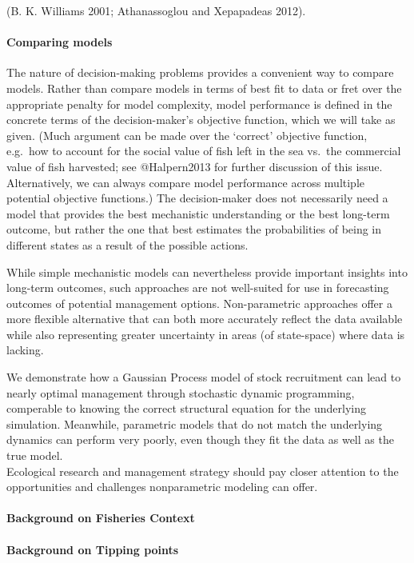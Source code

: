 \documentclass[author-year, review]{elsarticle} %
\begin{document}
(B. K. Williams 2001; Athanassoglou and Xepapadeas 2012).

\paragraph{Comparing models}

The nature of decision-making problems provides a convenient way to
compare models. Rather than compare models in terms of best fit to data
or fret over the appropriate penalty for model complexity, model
performance is defined in the concrete terms of the decision-maker's
objective function, which we will take as given. (Much argument can be
made over the `correct' objective function, e.g.~how to account for the
social value of fish left in the sea vs.~the commercial value of fish
harvested; see @Halpern2013 for further discussion of this issue.
Alternatively, we can always compare model performance across multiple
potential objective functions.) The decision-maker does not necessarily
need a model that provides the best mechanistic understanding or the
best long-term outcome, but rather the one that best estimates the
probabilities of being in different states as a result of the possible
actions.

While simple mechanistic models can nevertheless provide important
insights into long-term outcomes, such approaches are not well-suited
for use in forecasting outcomes of potential management options.
Non-parametric approaches offer a more flexible alternative that can
both more accurately reflect the data available while also representing
greater uncertainty in areas (of state-space) where data is lacking.

We demonstrate how a Gaussian Process model of stock recruitment can
lead to nearly optimal management through stochastic dynamic
programming, comperable to knowing the correct structural equation for
the underlying simulation. Meanwhile, parametric models that do not
match the underlying dynamics can perform very poorly, even though they
fit the data as well as the true model.\\Ecological research and
management strategy should pay closer attention to the opportunities and
challenges nonparametric modeling can offer.

\paragraph{Background on Fisheries Context}

\paragraph{Background on Tipping points}
\end{document}
